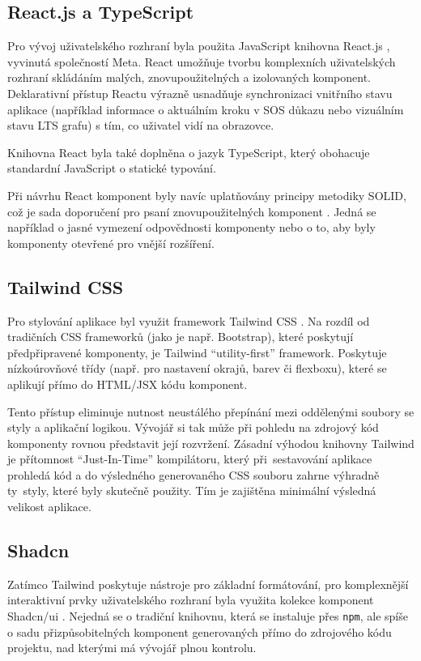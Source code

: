 \subsection{React.js a TypeScript}
Pro vývoj uživatelského rozhraní byla použita JavaScript knihovna React.js \cite{metaopensource_2025_react}, vyvinutá společností Meta. 
React umožňuje tvorbu komplexních uživatelských rozhraní skládáním malých, znovupoužitelných a izolovaných komponent. 
Deklarativní přístup Reactu výrazně usnadňuje synchronizaci vnitřního stavu aplikace (například informace o aktuálním kroku v SOS důkazu nebo vizuálním stavu LTS grafu) s tím, co uživatel vidí na obrazovce.

Knihovna React byla také doplněna o jazyk TypeScript, který obohacuje standardní JavaScript o statické typování. 

Při návrhu React komponent byly navíc uplatňovány principy metodiky SOLID, což je sada doporučení pro psaní znovupoužitelných komponent \cite{drruvari_2024_mastering}. 
Jedná se například o jasné vymezení odpovědnosti komponenty nebo o to, aby byly komponenty otevřené pro vnější rozšíření.

\subsection{Tailwind CSS}
Pro stylování aplikace byl využit framework Tailwind CSS \cite{tailwindcss_2025_tailwind}. 
Na rozdíl od tradičních CSS frameworků (jako je např. Bootstrap), které poskytují předpřipravené komponenty, je Tailwind \enquote{utility-first} framework. 
Poskytuje nízkoúrovňové třídy (např. pro nastavení okrajů, barev či flexboxu), které se aplikují přímo do HTML/JSX kódu komponent. 

Tento přístup eliminuje nutnost neustálého přepínání mezi oddělenými soubory se styly a aplikační logikou.
Vývojář si tak může při pohledu na zdrojový kód komponenty rovnou představit její rozvržení. 
Zásadní výhodou knihovny Tailwind je přítomnost \enquote{Just-In-Time} kompilátoru, který při~sestavování aplikace prohledá kód a do výsledného generovaného CSS souboru zahrne výhradně ty~styly, které byly skutečně použity. 
Tím je zajištěna minimální výsledná velikost aplikace. 

\subsection{Shadcn}
Zatímco Tailwind poskytuje nástroje pro základní formátování, pro komplexnější interaktivní prvky uživatelského rozhraní byla využita kolekce komponent Shadcn/ui \cite{shadcn_2024_shadcnui}. 
Nejedná se o tradiční knihovnu, která se instaluje přes \texttt{npm}, ale spíše o sadu přizpůsobitelných komponent generovaných přímo do zdrojového kódu projektu, nad kterými má vývojář plnou kontrolu. 

